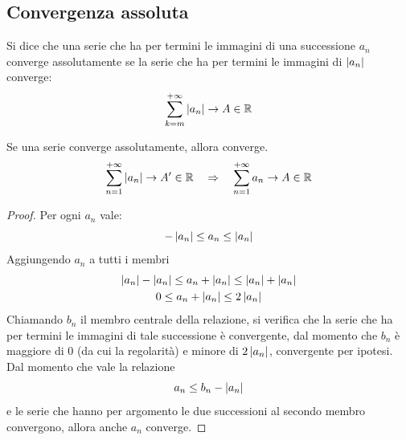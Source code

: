 \subsection{Convergenza assoluta}
\begin{defin}
	Si dice che una serie che ha per termini le immagini di una successione $a_n$ converge assolutamente se la serie che ha per termini le immagini di $\left\lvert a_n \right\rvert$ converge:
	\[
		\sum_{k=m}^{+\infty} \left\lvert a_n \right\rvert\to A\in\mathbb{R}
	\]
\end{defin}
\begin{teor}
	\label{teor:convass}
	Se una serie converge assolutamente, allora converge.
	\[
		\sum_{n=1}^{+\infty}\left\lvert a_n \right\rvert\to A'\in\mathbb{R}\quad\Rightarrow\quad \sum_{n=1}^{+\infty} a_n\to A\in\mathbb{R}
	\]
\end{teor}
\begin{proof}
	Per ogni $a_n$ vale:
	\[
		-\left\lvert a_n \right\rvert\leq a_n\leq \left\lvert a_n \right\rvert
	\]
	Aggiungendo $a_n$ a tutti i membri
	\begin{gather*}
		\left\lvert a_n \right\rvert-\left\lvert a_n \right\rvert\leq a_n+\left\lvert a_n \right\rvert\leq \left\lvert a_n \right\rvert+\left\lvert a_n \right\rvert\\
		0\leq a_n+\left\lvert a_n \right\rvert\leq 2\left\lvert a_n \right\rvert
	\end{gather*}
	Chiamando $b_n$ il membro centrale della relazione, si verifica che la serie che ha per termini le immagini di tale successione è convergente, dal momento che $b_n$ è maggiore di $0$ (da cui la regolarità) e minore di $2\left\lvert a_n \right\rvert$, convergente per ipotesi. Dal momento che vale la relazione
	\[
		a_n\leq b_n-\left\lvert a_n \right\rvert
	\]
	e le serie che hanno per argomento le due successioni al secondo membro convergono, allora anche $a_n$ converge.
\end{proof}


